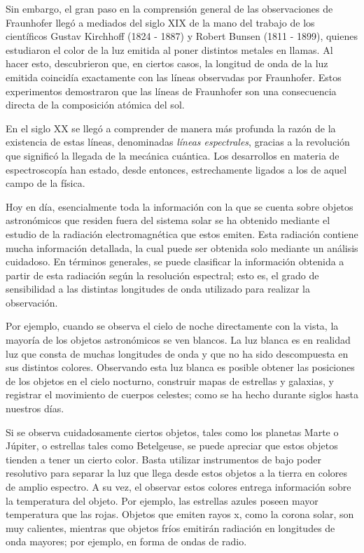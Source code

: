 Sin embargo, el gran paso en la comprensión general de las observaciones de Fraunhofer llegó a mediados del siglo XIX de la mano del trabajo de los científicos Gustav Kirchhoff (1824 - 1887) y Robert Bunsen (1811 - 1899), quienes estudiaron el color de la luz emitida al poner distintos metales en llamas. Al hacer esto, descubrieron que, en ciertos casos, la longitud de onda de la luz emitida coincidía exactamente con las líneas observadas por Fraunhofer. Estos experimentos demostraron que las líneas de Fraunhofer son una consecuencia directa de la composición atómica del sol.

En el siglo XX se llegó a comprender de manera más profunda la razón de la existencia de estas líneas, denominadas \textit{líneas espectrales}, gracias a la revolución que significó la llegada de la mecánica cuántica. Los desarrollos en materia de espectroscopía han estado, desde entonces, estrechamente ligados a los de aquel campo de la física.

Hoy en día, esencialmente toda la información con la que se cuenta sobre objetos astronómicos que residen fuera del sistema solar se ha obtenido mediante el estudio de la radiación electromagnética que estos emiten. Esta radiación contiene mucha información detallada, la cual puede ser obtenida solo mediante un análisis cuidadoso. En términos generales, se puede clasificar la información obtenida a partir de esta radiación según la resolución espectral; esto es, el grado de sensibilidad a las distintas longitudes de onda utilizado para realizar la observación.

Por ejemplo, cuando se observa el cielo de noche directamente con la vista, la mayoría de los objetos astronómicos se ven blancos. La luz blanca es en realidad luz que consta de muchas longitudes de onda y que no ha sido descompuesta en sus distintos colores. Observando esta luz blanca es posible obtener las posiciones de los objetos en el cielo nocturno, construir mapas de estrellas y galaxias, y registrar el movimiento de cuerpos celestes; como se ha hecho durante siglos hasta nuestros días.

Si se observa cuidadosamente ciertos objetos, tales como los planetas Marte o Júpiter, o estrellas tales como Betelgeuse, se puede apreciar que estos objetos tienden a tener un cierto color. Basta utilizar instrumentos de bajo poder resolutivo para separar la luz que llega desde estos objetos a la tierra en colores de amplio espectro. A su vez, el observar estos colores entrega información sobre la temperatura del objeto. Por ejemplo, las estrellas azules poseen mayor temperatura que las rojas. Objetos que emiten rayos x, como la corona solar, son muy calientes, mientras que objetos fríos emitirán radiación en longitudes de onda mayores; por ejemplo, en forma de ondas de radio.

